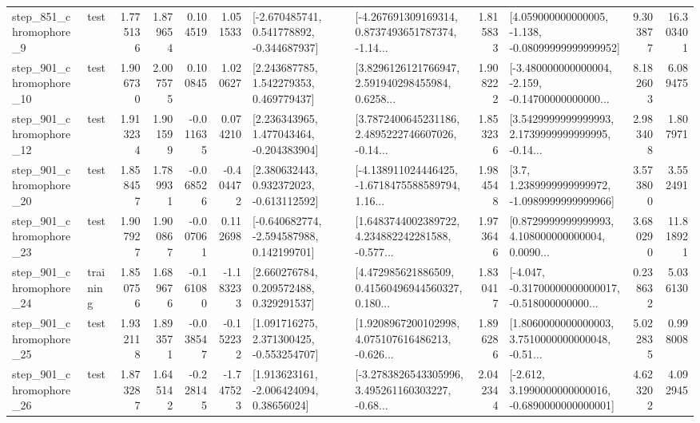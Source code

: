 \begin{tabular}{llrrrrllrlrr}
   step\_851\_chromophore\_9 &      test &      1.775136 &    1.879654 &      0.104519 &  1.051533 &   [-2.670485741, 0.541778892, -0.344687937] &  [-4.267691309169314, 0.8737493651787374, -1.14... &       1.815833 &  [4.059000000000005, -1.138, -0.08099999999999952] &            9.303877 &         16.303401 \\
  step\_901\_chromophore\_10 &      test &      1.906730 &    2.007575 &      0.100845 &  1.020627 &     [2.243687785, 1.542279353, 0.469779437] &  [3.8296126121766947, 2.591940298455984, 0.6258... &       1.908222 &  [-3.480000000000004, -2.159, -0.14700000000000... &            8.182603 &          6.089475 \\
  step\_901\_chromophore\_12 &      test &      1.913234 &    1.901599 &     -0.011635 &  0.074210 &    [2.236343965, 1.477043464, -0.204383904] &  [3.7872400645231186, 2.4895222746607026, -0.14... &       1.853236 &  [3.5429999999999993, 2.1739999999999995, -0.14... &            2.983408 &          1.807971 \\
  step\_901\_chromophore\_20 &      test &      1.858457 &    1.789931 &     -0.068526 & -0.404472 &    [2.380632443, 0.932372023, -0.613112592] &  [-4.138911024446425, -1.6718475588589794, 1.16... &       1.984548 &     [3.7, 1.2389999999999972, -1.0989999999999966] &            3.573800 &          3.552491 \\
  step\_901\_chromophore\_23 &      test &      1.907927 &    1.900867 &     -0.007061 &  0.112698 &   [-0.640682774, -2.594587988, 0.142199701] &  [1.6483744002389722, 4.234882242281588, -0.577... &       1.973646 &  [0.8729999999999993, 4.108000000000004, 0.0090... &            3.680290 &         11.818921 \\
  step\_901\_chromophore\_24 &  training &      1.850756 &    1.689676 &     -0.161080 & -1.183233 &     [2.660276784, 0.209572488, 0.329291537] &  [4.472985621886509, 0.41560496944560327, 0.180... &       1.830417 &  [-4.047, -0.31700000000000017, -0.518000000000... &            0.238632 &          5.036130 \\
  step\_901\_chromophore\_25 &      test &      1.932118 &    1.893571 &     -0.038547 & -0.152232 &    [1.091716275, 2.371300425, -0.553254707] &  [1.9208967200102998, 4.075107616486213, -0.626... &       1.896286 &  [1.8060000000000003, 3.7510000000000048, -0.51... &            5.022835 &          0.998008 \\
  step\_901\_chromophore\_26 &      test &      1.873287 &    1.645142 &     -0.228145 & -1.747523 &     [1.913623161, -2.006424094, 0.38656024] &  [-3.2783826543305996, 3.495261160303227, -0.68... &       2.042344 &  [-2.612, 3.1990000000000016, -0.6890000000000001] &            4.623202 &          4.092945 \\

\end{tabular}
